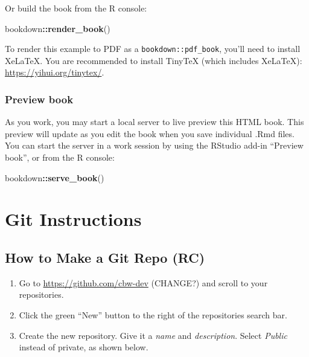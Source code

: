 \documentclass[
]{book}
\newenvironment{Shaded}{\begin{snugshade}}{\end{snugshade}}
\newcommand{\FunctionTok}[1]{\textcolor[rgb]{0.13,0.29,0.53}{\textbf{#1}}}
\newcommand{\NormalTok}[1]{#1}
\newcommand{\SpecialCharTok}[1]{\textcolor[rgb]{0.81,0.36,0.00}{\textbf{#1}}}
\theoremstyle{definition}
\theoremstyle{definition}
\theoremstyle{definition}
\theoremstyle{definition}
\theoremstyle{remark}
\begin{document}
Or build the book from the R console:

\begin{Shaded}
\begin{Highlighting}[]
\NormalTok{bookdown}\SpecialCharTok{::}\FunctionTok{render\_book}\NormalTok{()}
\end{Highlighting}
\end{Shaded}

To render this example to PDF as a \texttt{bookdown::pdf\_book}, you'll need to install XeLaTeX. You are recommended to install TinyTeX (which includes XeLaTeX): \url{https://yihui.org/tinytex/}.

\subsection{Preview book}\label{preview-book}

As you work, you may start a local server to live preview this HTML book. This preview will update as you edit the book when you save individual .Rmd files. You can start the server in a work session by using the RStudio add-in ``Preview book'', or from the R console:

\begin{Shaded}
\begin{Highlighting}[]
\NormalTok{bookdown}\SpecialCharTok{::}\FunctionTok{serve\_book}\NormalTok{()}
\end{Highlighting}
\end{Shaded}

\chapter{Git Instructions}\label{git-instructions}

\section{How to Make a Git Repo (RC)}\label{how-to-make-a-git-repo-rc}

\begin{enumerate}
\def\labelenumi{\arabic{enumi}.}
\item
  Go to \url{https://github.com/cbw-dev} (CHANGE?) and scroll to your repositories.
\item
  Click the green ``New'' button to the right of the repositories search bar.
\item
  Create the new repository. Give it a \emph{name} and \emph{description}. Select \emph{Public} instead of private, as shown below.
\end{enumerate}
\end{document}
